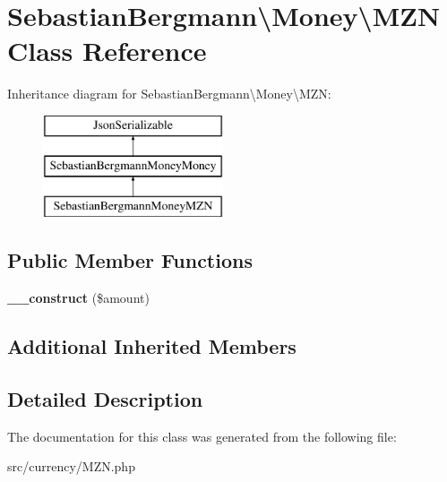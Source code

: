 \hypertarget{classSebastianBergmann_1_1Money_1_1MZN}{}\section{Sebastian\+Bergmann\textbackslash{}Money\textbackslash{}M\+Z\+N Class Reference}
\label{classSebastianBergmann_1_1Money_1_1MZN}
Inheritance diagram for Sebastian\+Bergmann\textbackslash{}Money\textbackslash{}M\+Z\+N\+:\begin{figure}[H]
\begin{center}
\leavevmode
\includegraphics[height=3.000000cm]{classSebastianBergmann_1_1Money_1_1MZN}
\end{center}
\end{figure}
\subsection*{Public Member Functions}
\begin{DoxyCompactItemize}
\item 
\hypertarget{classSebastianBergmann_1_1Money_1_1MZN_ab71c941b015a26410e369416b641a864}{}{\bfseries \+\_\+\+\_\+construct} (\$amount)\label{classSebastianBergmann_1_1Money_1_1MZN_ab71c941b015a26410e369416b641a864}

\end{DoxyCompactItemize}
\subsection*{Additional Inherited Members}


\subsection{Detailed Description}


The documentation for this class was generated from the following file\+:\begin{DoxyCompactItemize}
\item 
src/currency/M\+Z\+N.\+php\end{DoxyCompactItemize}
